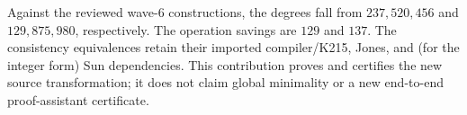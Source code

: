 Against the reviewed wave-6 constructions, the degrees fall from
$237{,}520{,}456$ and $129{,}875{,}980$, respectively. The operation savings
are $129$ and $137$. The consistency equivalences retain their imported
compiler/K215, Jones, and (for the integer form) Sun dependencies. This
contribution proves and certifies the new source transformation; it does
not claim global minimality or a new end-to-end proof-assistant certificate.
